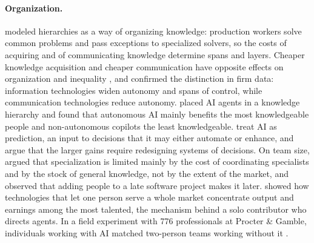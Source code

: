 \paragraph{Organization.} \citet{garicano2000hierarchies} modeled hierarchies as a way of organizing knowledge: production workers solve common problems and pass exceptions to specialized solvers, so the costs of acquiring and of communicating knowledge determine spans and layers. Cheaper knowledge acquisition and cheaper communication have opposite effects on organization and inequality \citep{garicano2006organization,garicano2015knowledge}, and \citet{bloom2014distinct} confirmed the distinction in firm data: information technologies widen autonomy and spans of control, while communication technologies reduce autonomy. \citet{ide2025artificial} placed AI agents in a knowledge hierarchy and found that autonomous AI mainly benefits the most knowledgeable people and non-autonomous copilots the least knowledgeable. \citet{agrawal2019artificial} treat AI as prediction, an input to decisions that it may either automate or enhance, and \citet{agrawal2022power} argue that the larger gains require redesigning systems of decisions. On team size, \citet{becker1992division} argued that specialization is limited mainly by the cost of coordinating specialists and by the stock of general knowledge, not by the extent of the market, and \citet{brooks1975mythical} observed that adding people to a late software project makes it later. \citet{rosen1981economics} showed how technologies that let one person serve a whole market concentrate output and earnings among the most talented, the mechanism behind a solo contributor who directs agents. In a field experiment with 776 professionals at Procter \& Gamble, individuals working with AI matched two-person teams working without it \citep{dellacqua2026cybernetic}.


